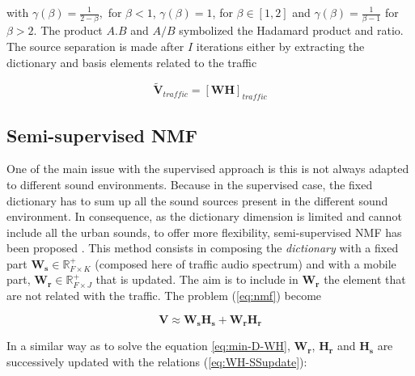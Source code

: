 \documentclass[twocolumn,a4paper,10pt]{article}
\begin{document}
with $\gamma(\beta) = \frac{1}{2-\beta},$ for $\beta < 1$, $ \gamma(\beta) = 1$, for $\beta \in \left[1,2\right]$ and $\gamma(\beta) = \frac{1}{\beta-1}$ for $\beta > 2$. The product $A.B$ and $A/B$ symbolized the Hadamard product and ratio. The source separation is made after $I$ iterations either by extracting the dictionary and basis elements related to the traffic

\begin{equation}\label{eq:separationExtraction}
\mathbf{\tilde{V}}_{traffic} = \left[ \mathbf{WH} \right]_{traffic}
\end{equation}

% 
%
%

\subsection{Semi-supervised NMF}

One of the main issue with the supervised approach is this is not always adapted to different sound environments. Because in the supervised case, the fixed dictionary has to sum up all the sound sources present in the different sound environment. In consequence, as the dictionary dimension is limited and cannot include all the urban sounds, to offer more flexibility, semi-supervised NMF has been proposed \cite{lee_semi-supervised_2010}. This method consists in composing the \textit{dictionary} with a fixed part $\mathbf{W_s} \in \mathbb{R}^+_{F\times K}$ (composed here of traffic audio spectrum) and with a mobile part, $\mathbf{W_r} \in \mathbb{R}^+_{F\times J}$ that is updated. The aim is to include in $\mathbf{W_r}$ the element that are not related with the traffic. The problem (\ref{eq:nmf}) become

\begin{equation}
\mathbf{V} \approx \mathbf{W_s H_s}+ \mathbf{W_r H_r}
\end{equation}

In a similar way as to solve the equation \ref{eq:min-D-WH}, $\mathbf{W_r}$, $\mathbf{H_r}$ and $\mathbf{H_s}$ are successively updated with the relations (\ref{eq:WH-SSupdate}): 
\end{document}
